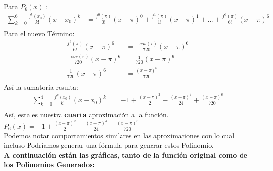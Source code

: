 Para $P_{6}(x)$ :
\begin{align*}
   \sum_{k=0}^{6} \frac{f^{k}(x_{0})}{k!}(x-x_{0})^{k} &= \frac{f^{0}(\pi)}{0!}(x-\pi)^{0} + \frac{f^{1}(\pi)}{1!}(x-\pi)^{1} + ... + \frac{f^{6}(\pi)}{6!}(x-\pi)^{6}\\
\end{align*}
Para el nuevo Término:
\begin{align*}
   \frac{f^{6}(\pi)}{6!}(x-\pi)^{6}                    &= \frac{-cos(\pi)}{720}(x-\pi)^{6} \\
   \frac{-cos(\pi)}{720}(x-\pi)^{6}                      &= \frac{1}{720}(x-\pi)^{6}\\
   \frac{1}{720}(x-\pi)^{6}                              &= \frac{(x-\pi)^{6}}{720}\\
\end{align*}
Así la sumatoria resulta:
\begin{align*}
   \sum_{k=0}^{4} \frac{f^{k}(x_{0})}{k!}(x-x_{0})^{k} &= -1 + \frac{(x-\pi)^{2}}{2} -\frac{(x-\pi)^{4}}{24} + \frac{(x-\pi)^{6}}{720}\\
\end{align*}
Así, esta es nuestra \textbf{cuarta} aproximación a la función. $P_{6}(x) = -1 + \frac{(x-\pi)^{2}}{2} -\frac{(x-\pi)^{4}}{24} + \frac{(x-\pi)^{6}}{720}$ \\
\newline
Podemos notar comportamientos similares en las aproximaciones con lo cual incluso Podríamos generar una fórmula para generar estos Polinomio. \\
\newline
\textbf{A continuación están las gráficas, tanto de la función original como de los Polinomios Generados:} \\

